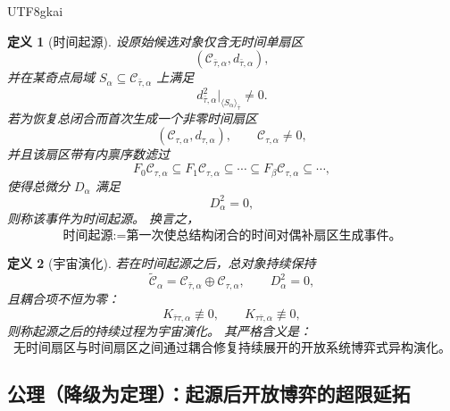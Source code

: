 \documentclass[12pt]{article}
\newtheorem{definition}{定义}[section]
\begin{document}
\begin{CJK*}{UTF8}{gkai}
\begin{definition}[时间起源]
\label{def:tex43-time-origin-explanation}
设原始候选对象仅含无时间单扇区
\[
  (\mathcal C_{\bar\tau,\alpha},d_{\bar\tau,\alpha}),
\]
并在某奇点局域 $S_\alpha\subseteq \mathcal C_{\bar\tau,\alpha}$ 上满足
\[
  d_{\bar\tau,\alpha}^2\big|_{\langle S_\alpha\rangle_{\bar\tau}}\neq 0.
\]
若为恢复总闭合而首次生成一个非零时间扇区
\[
  (\mathcal C_{\tau,\alpha},d_{\tau,\alpha}),
  \qquad
  \mathcal C_{\tau,\alpha}\neq 0,
\]
并且该扇区带有内禀序数滤过
\[
  F_0\mathcal C_{\tau,\alpha}\subseteq F_1\mathcal C_{\tau,\alpha}\subseteq\cdots\subseteq F_\beta\mathcal C_{\tau,
    \alpha}\subseteq\cdots,
\]
使得总微分 $D_\alpha$ 满足
\[
  D_\alpha^2=0,
\]
则称该事件为\emph{时间起源}。
换言之，
\[
  \boxed{
    \text{时间起源}
    :=
    \text{第一次使总结构闭合的时间对偶补扇区生成事件。}
  }
\]
\end{definition}

\begin{definition}[宇宙演化]
\label{def:tex43-universe-evolution-explanation}
若在时间起源之后，总对象持续保持
\[
  \widetilde{\mathcal C}_\alpha
  =
  \mathcal C_{\bar\tau,\alpha}\oplus \mathcal C_{\tau,\alpha},
  \qquad
  D_\alpha^2=0,
\]
且耦合项不恒为零：
\[
  K_{\bar\tau\tau,\alpha}\not\equiv 0,
  \qquad
  K_{\tau\bar\tau,\alpha}\not\equiv 0,
\]
则称起源之后的持续过程为\emph{宇宙演化}。
其严格含义是：
\[
  \boxed{
    \text{无时间扇区与时间扇区之间通过耦合修复持续展开的开放系统博弈式异构演化。}
  }
\]
\end{definition}

\subsection{公理（降级为定理）：起源后开放博弈的超限延拓}
\label{subsec:tex43-ch10-axiom-downgrade}


\end{CJK*}
\end{document}
